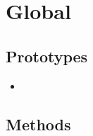 \section{Global}


\subsection{Prototypes}
\begin{itemize}
\item {}
\end{itemize}

\subsection{Methods}


